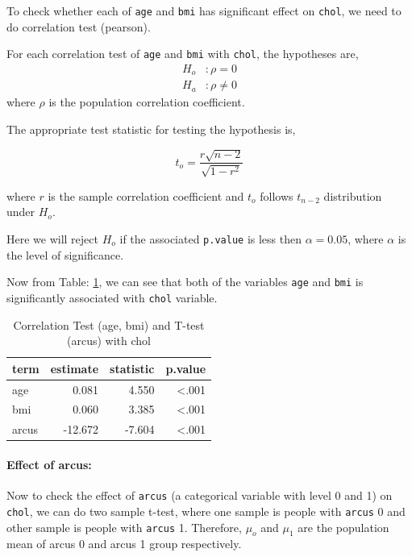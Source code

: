 \documentclass[
  12pt,
  oneside]{article}
\begin{document}
To check whether each of \texttt{age} and \texttt{bmi} has significant effect on \texttt{chol}, we need to do correlation test (pearson).

For each correlation test of \texttt{age} and \texttt{bmi} with \texttt{chol}, the hypotheses are,
\begin{align*}
H_o&: \rho = 0 \\
H_a&: \rho \neq 0
\end{align*}
where \(\rho\) is the population correlation coefficient.

The appropriate test statistic for testing the hypothesis is,

\[
t_o = \frac{r\sqrt{n-2}}{\sqrt{1-r^2}}
\]

where \(r\) is the sample correlation coefficient and \(t_o\) follows \(t_{n-2}\)
distribution under \(H_o\).

Here we will reject \(H_o\) if the associated \texttt{p.value} is less then \(\alpha = 0.05\), where \(\alpha\) is the level of significance.

Now from Table: \ref{tab:Table-02}, we can see that both of the variables \texttt{age} and \texttt{bmi}
is significantly associated with \texttt{chol} variable.

\begin{table}[H]

\caption{\label{tab:Table-02}Correlation Test (age, bmi) and T-test (arcus) with chol}
\centering
\begin{tabular}[t]{lrrr}
\toprule
term & estimate & statistic & p.value\\
\midrule
age & 0.081 & 4.550 & <.001\\
bmi & 0.060 & 3.385 & <.001\\
arcus & -12.672 & -7.604 & <.001\\
\bottomrule
\end{tabular}
\end{table}

\hypertarget{effect-of-arcus}{%
\paragraph{Effect of arcus:}\label{effect-of-arcus}}

Now to check the effect of \texttt{arcus} (a categorical variable with level 0 and 1) on \texttt{chol}, we can do two sample t-test, where one sample is people with \texttt{arcus} 0 and
other sample is people with \texttt{arcus} 1. Therefore, \(\mu_o\) and \(\mu_1\) are the
population mean of arcus 0 and arcus 1 group respectively.
\end{document}
